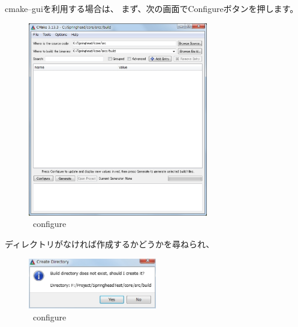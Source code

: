 \bigskip
cmake--guiを利用する場合は、
まず、次の画面でConfigureボタンを押します。
\newpage
\begin{narrow}[15pt]
	\begin{figure}[h]
	\begin{center}
	\includegraphics[width=0.7\textwidth]{fig/CmakeConfigure1.eps}
	\end{center}
	\caption{\cmake\ configure}
	\label{fig:CmakeConfigure}
	\end{figure}
\end{narrow}

\DQuote{\BldDir}ディレクトリがなければ作成するかどうかを尋ねられ、
\begin{narrow}[15pt]
	\begin{figure}[h]
	\begin{center}
	\includegraphics[width=0.5\textwidth]{fig/CmakeConfigure2.eps}
	\end{center}
	\caption{\cmake\ configure}
	\label{fig:CreateWorkSpace}
	\end{figure}
\end{narrow}

